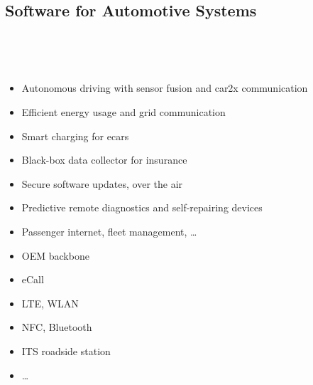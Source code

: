 \subsection{Software for Automotive Systems}
\begin{frame}{\insertsubsection\ }
	\centering{}
\end{frame}
\begin{frame}{\insertsubsection\ \mytitlesource{\ebertfavaro}}
	\begin{fancycolumns}[columns={3}, widths={35,40,25}]
		\begin{itemize}
			\item Autonomous driving with sensor fusion and car2x communication
			\item Efficient energy usage and grid communication
			\item Smart charging for ecars
			\item Black-box data collector for insurance
			\item Secure software updates, over the air
			\item Predictive remote diagnostics and self-repairing devices
			\item Passenger internet, fleet management, \dots
		\end{itemize}
		\nextcolumn
		
		
		\nextcolumn
		\begin{itemize}
			\item OEM backbone
			\item eCall
			\item LTE, WLAN
			\item NFC, Bluetooth
			\item ITS roadside station
			\item \dots
		\end{itemize}
	\end{fancycolumns}
\end{frame}

